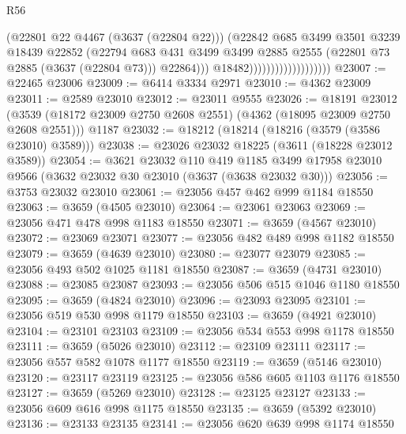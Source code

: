 \begin{lexlean}{R56}
\begin{coremodule}
                                            (@22801 @22 @4467 (@3637 (@22804 @22)))
                                            (@22842
                                              @685
                                              @3499
                                              @3501
                                              @3239
                                              @18439
                                              @22852
                                              (@22794
                                                @683
                                                @431
                                                @3499
                                                @3499
                                                @2885
                                                @2555
                                                (@22801 @73 @2885 (@3637 (@22804 @73)))
                                                @22864)))
                                          @18482)))))))))))))))))))
@23007 := @22465 @23006
@23009 := @6414 @3334 @2971
@23010 := @4362 @23009
@23011 := @2589 @23010
@23012 := @23011 @9555
@23026 := @18191
    @23012
    (@3539 (@18172 @23009 @2750 @2608 @2551) (@4362 (@18095 @23009 @2750 @2608 @2551)))
    @1187
@23032 := @18212 (@18214 (@18216 (@3579 (@3586 @23010) @3589)))
@23038 := @23026 @23032 @18225 (@3611 (@18228 @23012 @3589))
@23054 := @3621
    @23032
    @110
    @419
    @1185
    @3499
    @17958
    @23010
    @9566
    (@3632 @23032 @30 @23010 (@3637 (@3638 @23032 @30)))
@23056 := @3753 @23032 @23010
@23061 := @23056 @457 @462 @999 @1184 @18550
@23063 := @3659 (@4505 @23010)
@23064 := @23061 @23063
@23069 := @23056 @471 @478 @998 @1183 @18550
@23071 := @3659 (@4567 @23010)
@23072 := @23069 @23071
@23077 := @23056 @482 @489 @998 @1182 @18550
@23079 := @3659 (@4639 @23010)
@23080 := @23077 @23079
@23085 := @23056 @493 @502 @1025 @1181 @18550
@23087 := @3659 (@4731 @23010)
@23088 := @23085 @23087
@23093 := @23056 @506 @515 @1046 @1180 @18550
@23095 := @3659 (@4824 @23010)
@23096 := @23093 @23095
@23101 := @23056 @519 @530 @998 @1179 @18550
@23103 := @3659 (@4921 @23010)
@23104 := @23101 @23103
@23109 := @23056 @534 @553 @998 @1178 @18550
@23111 := @3659 (@5026 @23010)
@23112 := @23109 @23111
@23117 := @23056 @557 @582 @1078 @1177 @18550
@23119 := @3659 (@5146 @23010)
@23120 := @23117 @23119
@23125 := @23056 @586 @605 @1103 @1176 @18550
@23127 := @3659 (@5269 @23010)
@23128 := @23125 @23127
@23133 := @23056 @609 @616 @998 @1175 @18550
@23135 := @3659 (@5392 @23010)
@23136 := @23133 @23135
@23141 := @23056 @620 @639 @998 @1174 @18550

\end{coremodule}
\end{lexlean}
